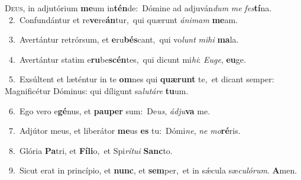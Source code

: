 \lettrine{\initial\textcolor{\initialcolor}{D}}{eus,} in adjutórium \textbf{me}\-um in\-\textbf{tén}\-de:~\star Dómine ad adjuván\textit{dum} \textit{me} \textit{fes}\-\textbf{tí}na.\\
{\numbfont\textcolor{\numbcolor}{~2.}}~Confundántur et re\-\textbf{ve}\-re\-\textbf{án}\-tur,~\star qui quærunt \textit{á}\-\textit{ni}\textit{mam} \textbf{me}\-am.\par
{\numbfont\textcolor{\numbcolor}{~3.}}~Avertántur retrórsum, et \textbf{e}\-ru\-\textbf{bés}\-cant,~\star qui vo\textit{lunt} \textit{mi}\-\textit{hi} \textbf{ma}\-la.\par
{\numbfont\textcolor{\numbcolor}{~4.}}~Avertántur statim e\-\textbf{ru}\-be\-\textbf{scén}\-tes,~\star qui dicunt mi\-\textit{hi}\-: \textit{Eu}\-\textit{ge}, \textbf{eu}\-ge.\par
{\numbfont\textcolor{\numbcolor}{~5.}}~Exsúltent et læténtur in te \textbf{om}\-nes qui \textbf{quæ}\-\textbf{runt} te,~\star et dicant semper: Magnificétur Dóminus: qui díligunt sa\-\textit{lu}\-\textit{tá}\textit{re} \textbf{tu}\-um.\par
{\numbfont\textcolor{\numbcolor}{~6.}}~Ego vero e\-\textbf{gé}\-nus, et \textbf{pau}\-\textbf{per} sum:~\star De\-\textit{us}\-, \textit{ád}\-\textit{ju}\textbf{va} me.\par
{\numbfont\textcolor{\numbcolor}{~7.}}~Adjútor meus, et liberátor \textbf{me}\-us \textbf{es} tu:~\star Dómi\-\textit{ne}\-, \textit{ne} \textit{mo}\-\textbf{ré}ris.\par
{\numbfont\textcolor{\numbcolor}{~8.}}~Glória \textbf{Pa}\-tri, et \textbf{Fí}\-\textbf{li}o,~\star et Spi\-\textit{rí}\-\textit{tu}\textit{i} \textbf{Sanc}\-to.\par
{\numbfont\textcolor{\numbcolor}{~9.}}~Sicut erat in princípio, et \textbf{nunc}\-, et \textbf{sem}\-per,~\star et in sǽcula sæ\-\textit{cu}\-\textit{ló}\textit{rum}. \textbf{A}\-men.\par
